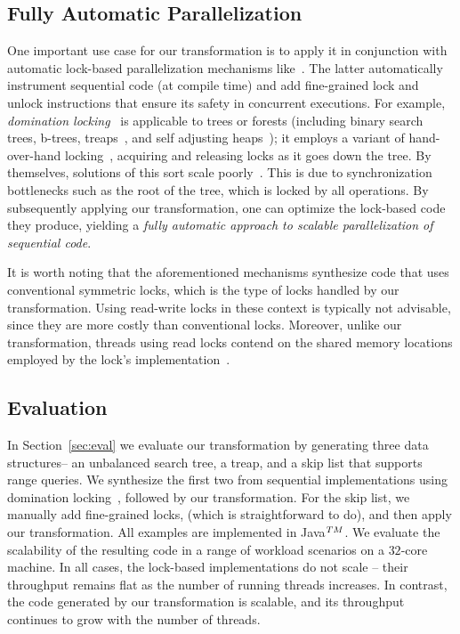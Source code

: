 \subsection{Fully Automatic Parallelization}
One important use case for our transformation is to apply it in conjunction with automatic lock-based 
parallelization mechanisms like~\cite{Gueta2011,MZGB:POPL06}. 
The latter automatically instrument sequential code (at compile time) 
and add fine-grained lock and unlock instructions that ensure its safety in concurrent executions. 
For example, \emph{domination locking}~\cite{Gueta2011} is applicable to trees or forests
(including binary search trees, b-trees, treaps~\cite{AragonS1989}, and self adjusting heaps~\cite{Sleator:SAH1986:SAH}); it
employs a variant of hand-over-hand locking~\cite{SilberschatzK1980},
acquiring and releasing locks as it goes down the tree.
By themselves, solutions of this sort scale poorly~\cite{Gueta2011}.
This is due to synchronization bottlenecks such as the root of the tree,
which is locked by all operations. 
By subsequently applying our transformation, one can optimize 
the lock-based code they produce, yielding a \emph{fully automatic approach to 
scalable parallelization of sequential code}. 

It is worth noting that the aforementioned mechanisms synthesize code that uses conventional symmetric locks, 
which is the type of locks handled by our transformation. Using read-write locks in these context is typically
not advisable, since they are more costly than conventional locks. Moreover, unlike our transformation, threads using 
read locks contend on the shared memory locations employed by the lock's implementation~\cite{xxx}. 

\subsection{Evaluation}
In Section~\ref{sec:eval} we evaluate our transformation by generating three data structures-- an unbalanced search tree, a treap, and a skip list that supports range queries. We synthesize the first two from sequential implementations using domination locking~\cite{Gueta2011}, followed by our transformation. 
For the skip list, we manually add fine-grained locks, (which is straightforward to do), and then apply our transformation. 
All examples are implemented in Java$^{\sc TM}$. We evaluate the scalability of the resulting code 
in a range of workload scenarios on a $32$-core machine.
In all cases, the lock-based implementations do not scale -- 
their throughput remains flat as the number of running threads increases. In contrast, the code generated by our transformation 
is scalable, and its throughput continues to grow with the number of threads.

